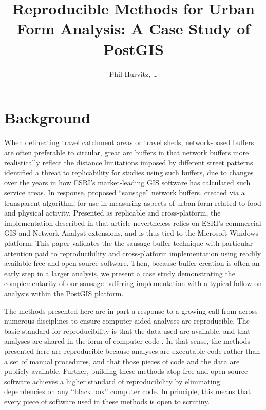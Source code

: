 \documentclass[12pt,letterpaper]{article} %
\title{Reproducible Methods for Urban Form Analysis: A Case Study of PostGIS}
\author{Phil Hurvitz, \ldots}
\date{}
\begin{document}
\maketitle

\section*{Background}
When delineating travel catchment areas or travel sheds, network-based
buffers are often preferable to circular, great arc buffers in that
network buffers more realistically reflect the distance limitations
imposed by different street patterns. \textcite{Forsyth2014sausage}
identified a threat to replicability for studies using such buffers,
due to changes over the years in how ESRI's market-leading GIS
software has calculated such service areas. In response,
\citeauthor{Forsyth2014sausage} proposed ``sausage'' network buffers,
created via a transparent algorithm, for use in measuring aspects of
urban form related to food and physical activity. Presented as
replicable and cross-platform, the implementation described in that
article nevertheless relies on ESRI's commercial GIS and Network
Analyst extensions, and is thus tied to the Microsoft Windows
platform. This paper validates the the sausage buffer technique with
particular attention paid to reproducibility and cross-platform
implementation using readily available free and open source
software. Then, because buffer creation is often an early step in a
larger analysis, we present a case study demonstrating the
complementarity of our sausage buffering implementation with a typical
follow-on analysis within the PostGIS platform.

The methods presented here are in part a response to a growing call
from across numerous disciplines to ensure computer aided analyses are
reproducible. The basic standard for reproducibility is that the data
used are available, and that analyses are shared in the form of
computer code \cite{Peng2011computational}. In that sense, the methods
presented here are reproducible because analyses are executable code
rather than a set of manual procedures, and that those pieces of code
and the data are publicly available. Further, building these methods
atop free and open source software achieves a higher standard of
reproducibility by eliminating dependencies on any ``black box''
computer code. In principle, this means that every piece of software
used in these methods is open to scrutiny.
\end{document}
